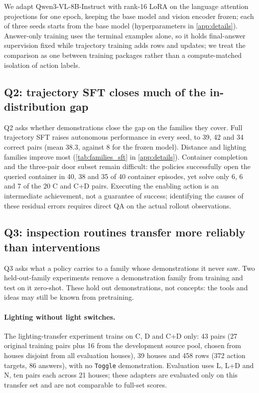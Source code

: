\documentclass{article}
\begin{document}
We adapt Qwen3-VL-8B-Instruct with rank-16 LoRA on the language attention projections for one epoch, keeping the base model and vision encoder frozen; each of three seeds starts from the base model (hyperparameters in \cref{app:details}). Answer-only training uses the terminal examples alone, so it holds final-answer supervision fixed while trajectory training adds rows and updates; we treat the comparison as one between training packages rather than a compute-matched isolation of action labels.

\subsection{Q2: trajectory SFT closes much of the in-distribution gap}
Q2 asks whether demonstrations close the gap on the families they cover. Full trajectory SFT raises autonomous performance in every seed, to 39, 42 and 34 correct pairs (mean 38.3, against 8 for the frozen model). Distance and lighting families improve most (\cref{tab:families_sft} in \cref{app:details}). Container completion and the three-pair door subset remain difficult: the policies successfully open the queried container in 40, 38 and 35 of 40 container episodes, yet solve only 6, 6 and 7 of the 20 C and C+D pairs. Executing the enabling action is an intermediate achievement, not a guarantee of success; identifying the causes of these residual errors requires direct QA on the actual rollout observations.


\subsection{Q3: inspection routines transfer more reliably than interventions}
\label{sec:transfer}
Q3 asks what a policy carries to a family whose demonstrations it never saw. Two held-out-family experiments remove a demonstration family from training and test on it zero-shot. These hold out demonstrations, not concepts: the tools and ideas may still be known from pretraining.

\paragraph{Lighting without light switches.} The lighting-transfer experiment trains on C, D and C+D only: 43 pairs (27 original training pairs plus 16 from the development source pool, chosen from houses disjoint from all evaluation houses), 39 houses and 458 rows (372 action targets, 86 answers), with no \texttt{Toggle} demonstration. Evaluation uses L, L+D and N, ten pairs each across 21 houses; these adapters are evaluated only on this transfer set and are not comparable to full-set scores.
\end{document}
